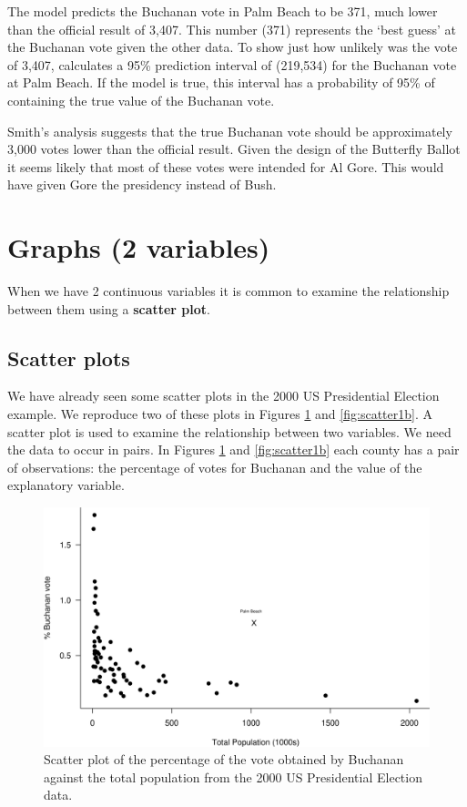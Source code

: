 \documentclass[
  11pt,
  british,
  openany, a4paper]{book}
\begin{document}
The model predicts the Buchanan vote in Palm Beach to be 371, much lower than the official result of 3,407. This number (371) represents the `best guess' at the Buchanan vote given the other data. To show just how unlikely was the vote of 3,407, \citet{election} calculates a 95\% prediction interval of (219,534) for the Buchanan vote at Palm Beach. If the model is true, this interval has a probability of 95\% of containing the true value of the Buchanan vote.

Smith's analysis suggests that the true Buchanan vote should be approximately 3,000 votes lower than the official result. Given the design of the Butterfly Ballot it seems likely that most of these votes were intended for Al Gore. This would have given Gore the presidency instead of Bush.

\hypertarget{graphs2}{%
\section{Graphs (2 variables)}\label{graphs2}}

When we have 2 continuous variables it is common to examine the relationship between them using a \textbf{scatter plot}.

\hypertarget{scatter-plots}{%
\subsection{Scatter plots}\label{scatter-plots}}

We have already seen some scatter plots in the 2000 US Presidential Election example. We reproduce two of these plots in Figures \ref{fig:scatter1a} and \ref{fig:scatter1b}. A scatter plot is used to examine the relationship between two variables. We need the data to occur in pairs. In Figures \ref{fig:scatter1a} and \ref{fig:scatter1b} each county has a pair of observations: the percentage of votes for Buchanan and the value of the explanatory variable.

\begin{figure}

{\centering \includegraphics[width=0.75\linewidth]{images/election_scatter1a} 

}

\caption{Scatter plot of the percentage of the vote obtained by Buchanan against the total population from the 2000 US Presidential Election data.}\label{fig:scatter1a}
\end{figure}
\end{document}
